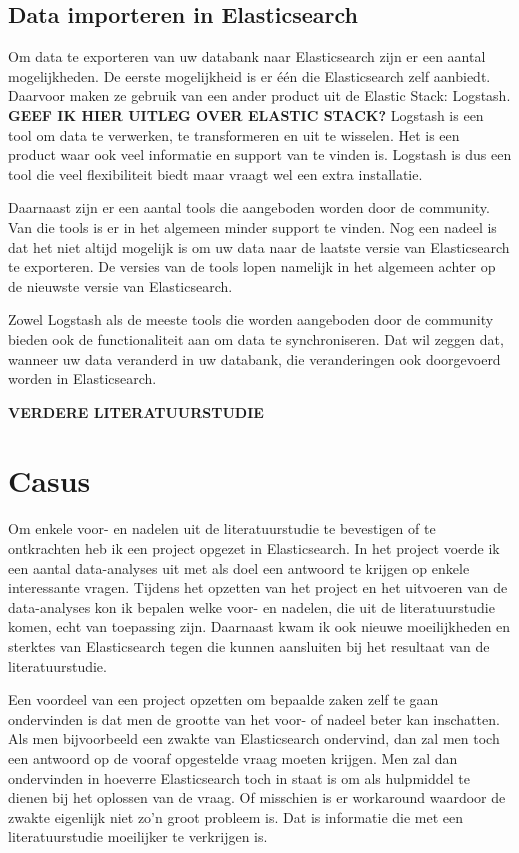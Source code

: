 \subsection{Data importeren in Elasticsearch}

Om data te exporteren van uw databank naar Elasticsearch zijn er een aantal mogelijkheden. De eerste mogelijkheid is er één die Elasticsearch zelf aanbiedt. Daarvoor maken ze gebruik van een ander product uit de Elastic Stack: Logstash. \textbf{GEEF IK HIER UITLEG OVER ELASTIC STACK?} Logstash is een tool om data te verwerken, te transformeren en uit te wisselen. Het is een product waar ook veel informatie en support van te vinden is. Logstash is dus een tool die veel flexibiliteit biedt maar vraagt wel een extra installatie. 

Daarnaast zijn er een aantal tools die aangeboden worden door de community. Van die tools is er in het algemeen minder support te vinden. Nog een nadeel is dat het niet altijd mogelijk is om uw data naar de laatste versie van Elasticsearch te exporteren. De versies van de tools lopen namelijk in het algemeen achter op de nieuwste versie van Elasticsearch. 

Zowel Logstash als de meeste tools die worden aangeboden door de community bieden ook de functionaliteit aan om data te synchroniseren. Dat wil zeggen dat, wanneer uw data veranderd in uw databank, die veranderingen ook doorgevoerd worden in Elasticsearch. 

\textbf{VERDERE LITERATUURSTUDIE}

\section{Casus}

Om enkele voor- en nadelen uit de literatuurstudie te bevestigen of te ontkrachten heb ik een project opgezet in Elasticsearch. In het project voerde ik een aantal data-analyses uit met als doel een antwoord te krijgen op enkele interessante vragen. Tijdens het opzetten van het project en het uitvoeren van de data-analyses kon ik bepalen welke voor- en nadelen, die uit de literatuurstudie komen, echt van toepassing zijn. Daarnaast kwam ik ook nieuwe moeilijkheden en sterktes van Elasticsearch tegen die kunnen aansluiten bij het resultaat van de literatuurstudie.

Een voordeel van een project opzetten om bepaalde zaken zelf te gaan ondervinden is dat men de grootte van het voor- of nadeel beter kan inschatten. Als men bijvoorbeeld een zwakte van Elasticsearch ondervind, dan zal men toch een antwoord op de vooraf opgestelde vraag moeten krijgen. Men zal dan ondervinden in hoeverre Elasticsearch toch in staat is om als hulpmiddel te dienen bij het oplossen van de vraag. Of misschien is er workaround waardoor de zwakte eigenlijk niet zo'n groot probleem is. Dat is informatie die met een literatuurstudie moeilijker te verkrijgen is.


